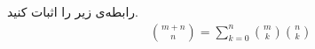 \p
رابطه‌ی زیر را اثبات کنید.
        \begin{align*}
       \binom{m + n}{n} = \sum\limits_{k=0}^{n} \binom{m}{k} \binom{n}{k}
        \end{align*}